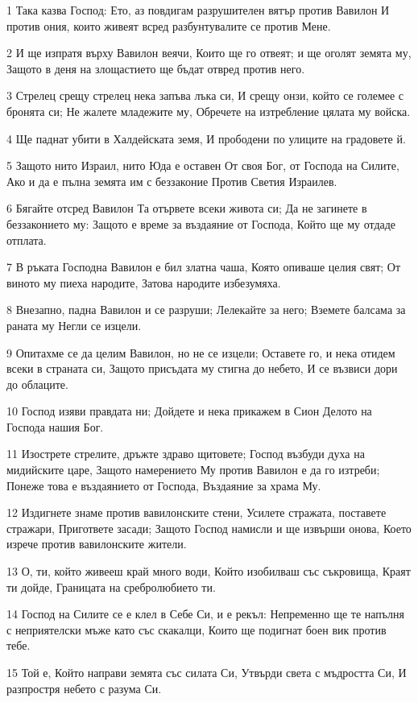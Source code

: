 \par 1 Така казва Господ: Ето, аз повдигам разрушителен вятър против Вавилон И против ония, които живеят всред разбунтувалите се против Мене.
\par 2 И ще изпратя върху Вавилон веячи, Които ще го отвеят; и ще оголят земята му, Защото в деня на злощастието ще бъдат отвред против него.
\par 3 Стрелец срещу стрелец нека запъва лъка си, И срещу онзи, който се големее с бронята си; Не жалете младежите му, Обречете на изтребление цялата му войска.
\par 4 Ще паднат убити в Халдейската земя, И прободени по улиците на градовете й.
\par 5 Защото нито Израил, нито Юда е оставен От своя Бог, от Господа на Силите, Ако и да е пълна земята им с беззаконие Против Светия Израилев.
\par 6 Бягайте отсред Вавилон Та отървете всеки живота си; Да не загинете в беззаконието му: Защото е време за въздаяние от Господа, Който ще му отдаде отплата.
\par 7 В ръката Господна Вавилон е бил златна чаша, Която опиваше целия свят; От виното му пиеха народите, Затова народите избезумяха.
\par 8 Внезапно, падна Вавилон и се разруши; Лелекайте за него; Вземете балсама за раната му Негли се изцели.
\par 9 Опитахме се да целим Вавилон, но не се изцели; Оставете го, и нека отидем всеки в страната си, Защото присъдата му стигна до небето, И се възвиси дори до облаците.
\par 10 Господ изяви правдата ни; Дойдете и нека прикажем в Сион Делото на Господа нашия Бог.
\par 11 Изострете стрелите, дръжте здраво щитовете; Господ възбуди духа на мидийските царе, Защото намерението Му против Вавилон е да го изтреби; Понеже това е въздаянието от Господа, Въздаяние за храма Му.
\par 12 Издигнете знаме против вавилонските стени, Усилете стражата, поставете стражари, Пригответе засади; Защото Господ намисли и ще извърши онова, Което изрече против вавилонските жители.
\par 13 О, ти, който живееш край много води, Който изобилваш със съкровища, Краят ти дойде, Границата на сребролюбието ти.
\par 14 Господ на Силите се е клел в Себе Си, и е рекъл: Непременно ще те напълня с неприятелски мъже като със скакалци, Които ще подигнат боен вик против тебе.
\par 15 Той е, Който направи земята със силата Си, Утвърди света с мъдростта Си, И разпростря небето с разума Си.

